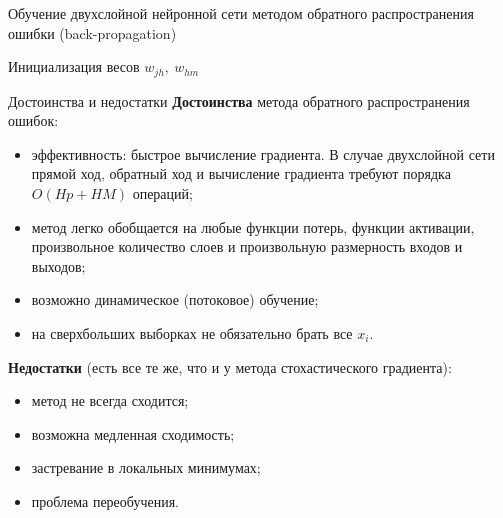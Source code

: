 \documentclass[11pt]{beamer}
\begin{document}
	\begin{frame}{Обучение двухслойной нейронной сети методом обратного распространения ошибки (back-propagation)}
		\fontsize{9.5}{7.2}\selectfont
		\begin{algorithm}[H]
			\SetAlgoLined
			
			Инициализация весов $w_{jh},~ w_{hm}$\;
		\end{algorithm}
	\end{frame}

	\begin{frame}{Достоинства и недостатки}
		\textbf{Достоинства} метода обратного распространения ошибок:
		\begin{itemize}
			\item эффективность: быстрое вычисление градиента. В случае двухслойной сети прямой ход, обратный ход и вычисление градиента требуют порядка $O(Hp+HM)$ операций;
			\item метод легко обобщается на любые функции потерь, функции активации, произвольное количество слоев и произвольную размерность входов и выходов;
			\item возможно динамическое (потоковое) обучение;
			\item на сверхбольших выборках не обязательно брать все $x_i$.
		\end{itemize}
		
		\textbf{Недостатки} (есть все те же, что и у метода стохастического градиента):
		\begin{itemize}
			\item метод не всегда сходится;
			\item возможна медленная сходимость;
			\item застревание в локальных минимумах;
			\item проблема переобучения.
		\end{itemize}
	\end{frame}
\end{document}
